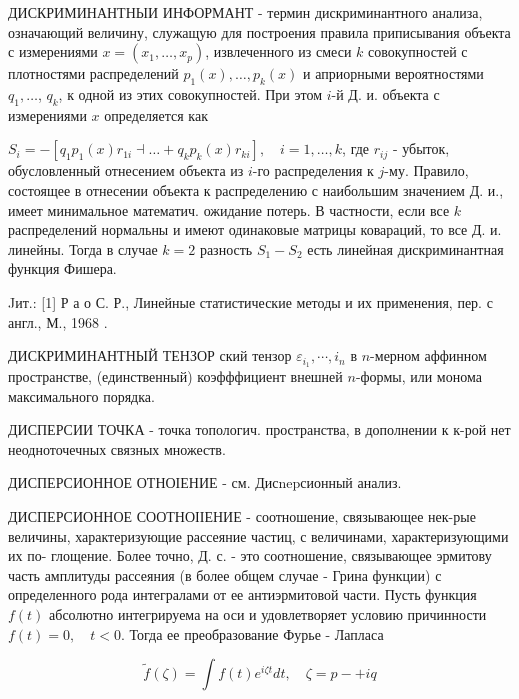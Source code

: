 \documentclass[10pt]{article}
\begin{document}
ДИСКРИМИНАНТНЫИ ИНФОРМАНТ - термин дискриминантного анализа, означающий величину, служащую для построения правила приписывания объекта с измерениями $x=\left(x_{1}, \ldots, x_{p}\right)$, извлеченного из смеси $k$ совокупностей с плотностями распределений $p_{1}(x), \ldots, p_{k}(x)$ и априорными вероятностями $q_{1}, \ldots$, $q_{k}$, к одной из этих совокупностей. При этом $i$-й Д. и. объекта с измерениями $x$ определяется как



$S_{i}=-\left[q_{1} p_{1}(x) r_{1 i} \dashv \ldots+q_{k} p_{k}(x) r_{k i}\right], \quad i=1, \ldots, k$, где $r_{i j}$ - убыток, обусловленный отнесением объекта из $i$-го распределения к $j$-му. Правило, состоящее в отнесении объекта к распределению с наибольшим значением Д. и., имеет минимальное математич. ожидание потерь. В частности, если все $k$ распределений нормальны и имеют одинаковые матрицы ковараций, то все Д. и. линейны. Тогда в случае $k=2$ разность $S_{1}-S_{2}$ есть линейная дискриминантная функция Фишера.



Jит.: [1] Р а о С. Р., Линейные статистические методы и их применения, пер. с англ., М., 1968 .



ДИСКРИМИНАНТНЫЙ ТЕНЗОР ский тензор $\varepsilon_{i_{1}}, \cdots, i_{n}$ в $n$-мерном аффинном пространстве, (единственный) коэфффициент внешней $n$-формы, или монома максимального порядка.



ДИСПЕРСИИ ТОЧКА - точка топологич. пространства, в дополнении к к-рой нет неодноточечных связных множеств.



ДИСПЕРСИОННОЕ ОТНОІЕНИЕ - см. Дисnepсионный анализ.



ДИСПЕРСИОННОЕ СООТНОІІЕНИЕ - соотношение, связывающее нек-рые величины, характеризующие рассеяние частиц, с величинами, характеризующими их по- глощение. Более точно, Д. с. - это соотношение, связывающее эрмитову часть амплитуды рассеяния (в более общем случае - Грина функции) с определенного рода интегралами от ее антиэрмитовой части. Пусть функция $f(t)$ абсолютно интегрируема на оси и удовлетворяет условию причинности $f(t)=0, \quad t<0$. Тогда ее преобразование Фурье - Лапласа



\[

\tilde{f}(\zeta)=\int f(t) e^{i \zeta t} d t, \quad \zeta=p-+i q

\]
\end{document}
